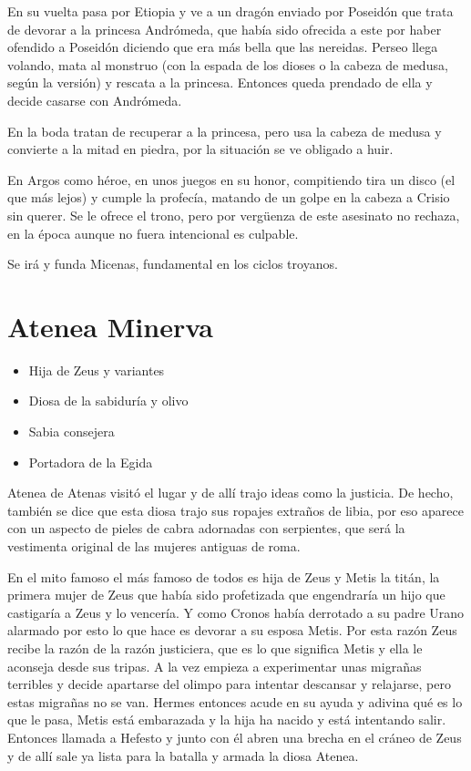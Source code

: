 En su vuelta pasa por Etiopia y ve a un dragón enviado por Poseidón que trata de devorar a la princesa Andrómeda, que había sido ofrecida a este por haber ofendido a Poseidón diciendo que era más bella que las nereidas. Perseo llega volando, mata al monstruo (con la espada de los dioses o la cabeza de medusa, según la versión) y rescata a la princesa. Entonces queda prendado de ella y decide casarse con Andrómeda.

En la boda tratan de recuperar a la princesa, pero usa la cabeza de medusa y convierte a la mitad en piedra, por la situación se ve obligado a huir.

En Argos como héroe, en unos juegos en su honor, compitiendo tira un disco (el que más lejos) y cumple la profecía, matando de un golpe en la cabeza a Crisio sin querer. Se le ofrece el trono, pero por vergüenza de este asesinato no rechaza, en la época aunque no fuera intencional es culpable.

Se irá y funda Micenas, fundamental en los ciclos troyanos.

\section{Atenea Minerva}
\begin{itemize}
    \item Hija de Zeus y variantes
    \item Diosa de la sabiduría y olivo
    \item Sabia consejera
    \item Portadora de la Egida
\end{itemize}

Atenea de Atenas visitó el lugar y de allí trajo ideas como la justicia. De hecho, también se dice que esta diosa trajo sus ropajes extraños de libia, por eso aparece con un aspecto de pieles de cabra adornadas con serpientes, que será la vestimenta original de las mujeres antiguas de roma.

En el mito famoso el más famoso de todos es hija de Zeus y Metis la titán, la primera mujer de Zeus que había sido profetizada que engendraría un hijo que castigaría a Zeus y lo vencería. Y como Cronos había derrotado a su padre Urano alarmado por esto lo que hace es devorar a su esposa Metis. Por esta razón Zeus recibe la razón de la razón justiciera, que es lo que significa Metis y ella le aconseja desde sus tripas. A la vez empieza a experimentar unas migrañas terribles y decide apartarse del olimpo para intentar descansar y relajarse, pero estas migrañas no se van. Hermes entonces acude en su ayuda y adivina qué es lo que le pasa, Metis está embarazada y la hija ha nacido y está intentando salir. Entonces llamada a Hefesto y junto con él abren una brecha en el cráneo de Zeus y de allí sale ya lista para la batalla y armada la diosa Atenea.

